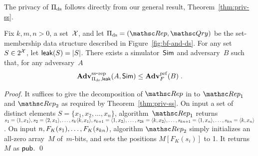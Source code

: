 The privacy of $\Pi_{\mathrm{ds}}$ follows directly from our general result, Theorem~\ref{thm:priv-ss}.
\begin{theorem}\label{thm:ds-ss}
Fix $k,m,n>0$, a set~${\cal X}$, and let $\setprim_{\mathrm{ds}}= (\Rep, \Qry)$ be the set-membership data structure described in Figure~\ref{fig:bf-and-ds}.  For any set~$S \in 2^{\cal X}$, let ${\sf leak}(S)=|S|$.  There exists a simulator~${\sf Sim}$ and adversary~$B$ such that, for any adversary~$A$
\[
\mathrm{\mathbf{Adv}}^{\mathrm{ss\mbox{-}rep}}_{\Pi_{\mathrm{ds}},{\sf leak}}(A,{\sf Sim}) \leq  \mathbf{Adv}^{\mathrm{prf}}_{F}(B)\;.
\]
\end{theorem}
\begin{proof}
It suffices to give the decomposition of $\Rep$ in to $\Rep_1$ and $\Rep_2$ as required by Theorem~\ref{thm:priv-ss}.
On input a set of distinct elements $S=\{x_1,x_2,\ldots,x_n\}$, algorithm~$\Rep_1$ returns $s_1=\langle 1,x_1 \rangle, s_2=\langle 2,x_1 \rangle, \ldots, s_k\langle k,x_1\rangle, s_{k+1}=\langle 1,x_2\rangle, \ldots,\linebreak s_{2k}=\langle k,x_2\rangle, \ldots ,s_{kn+1}=\langle 1,x_n\rangle, \ldots, s_{kn}=\langle k,x_n \rangle$.  On input $n,F_K(s_1),\ldots,\linebreak F_K(s_{kn})$, algorithm $\Rep_2$ simply initializes an all-zero array~$M$ of~$m$-bits, and sets the positions $M[F_K(s_i)]$ to 1.  It returns~$M$ as ${\sf pub}$. \hfill\qed
\end{proof}


